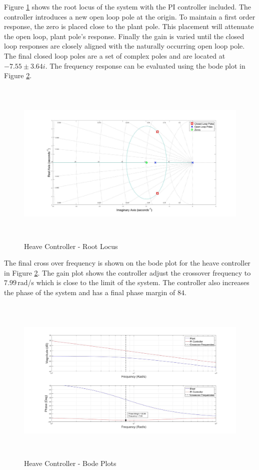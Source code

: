 	 Figure \ref{IM_HeaveControlRoot} shows the root locus of the system with the PI controller included. The controller introduces a new open loop pole at the origin. To maintain a first order response, the zero is placed close to the plant pole. This placement will attenuate the open loop, plant pole's response. Finally the gain is varied until the closed loop responses are closely aligned with the naturally occurring open loop pole. The final closed loop poles are a set of complex poles and are located at $-7.55 \pm 3.64 i$. The frequency response can be evaluated using the bode plot in Figure \ref{IM_HeaveControlBode}. 
	 
	 \begin{figure}[H]
	 	\centering
	 	\includegraphics[height = 8cm]{../Design/Matlab/Controllers/heave_root.jpg}
	 	\caption{Heave Controller -  Root Locus}
	 	\label{IM_HeaveControlRoot}
	 \end{figure}
	 
	 The final cross over frequency is shown on the bode plot for the heave controller in Figure \ref{IM_HeaveControlBode}. The gain plot shows the controller adjust the crossover frequency to $7.99$\,rad/s which is close to the limit of the system. The controller also increases the phase of the system and has a final phase margin of $84$\textdegree.
	 
	 \begin{figure}[H]
	 	\centering
	 	\includegraphics[height = 8cm]{../Design/Matlab/Controllers/heave_bode.jpg}
	 	\caption{Heave Controller -  Bode Plots}
	 	\label{IM_HeaveControlBode}
	 \end{figure}
	 
